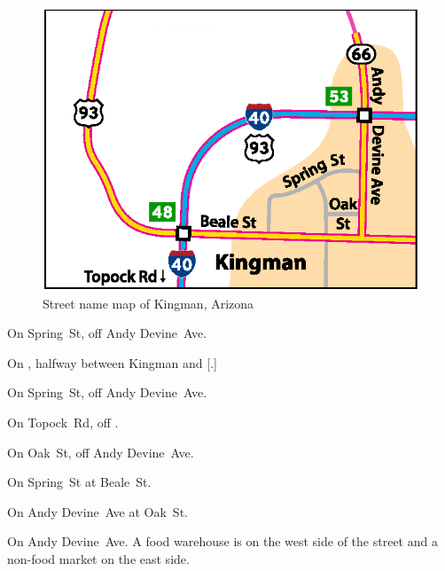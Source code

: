 
\begin{figure}[b!]
\includegraphics[scale=0.77]{cities/arizona/kingman}
\centering\caption{Street name map of Kingman, Arizona}
\end{figure}

\begin{LocationList}

On Spring~St, off Andy Devine~Ave.

On , halfway between Kingman and [.]

\Location{\GasStation \Gas}
On Spring~St, off Andy Devine~Ave.

On Topock~Rd, off  .

On Oak~St, off Andy Devine~Ave.

On Spring~St at Beale~St.

\Location{\TruckService \Service \Rest}
On Andy Devine~Ave at Oak~St.

On  Andy Devine~Ave.
A food warehouse is on the west side of the street and a non-food market on the east side.

\end{LocationList}

